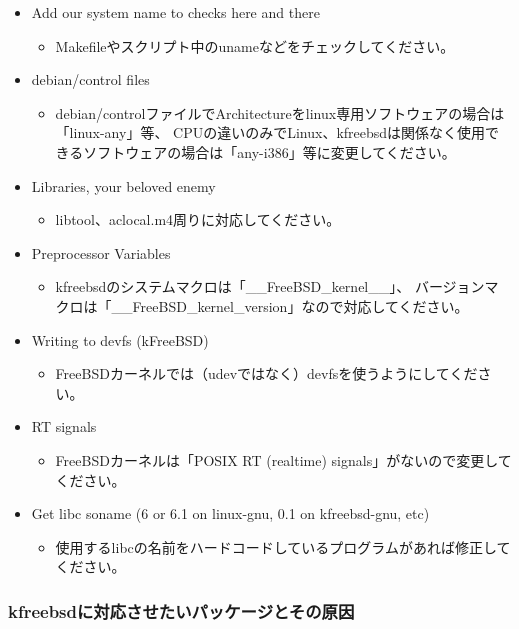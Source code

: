 \documentclass[mingoth,a4paper]{jsarticle}
\begin{document}
\begin{itemize}
 \item{Add our system name to checks here and there}
  \begin{itemize}
   \item{Makefileやスクリプト中のunameなどをチェックしてください。 }
  \end{itemize}
 \item{debian/control files}
  \begin{itemize}
   \item{debian/controlファイルでArchitectureをlinux専用ソフトウェアの場合は「linux-any」等、
CPUの違いのみでLinux、kfreebsdは関係なく使用できるソフトウェアの場合は「any-i386」等に変更してください。}
  \end{itemize}
 \item{Libraries, your beloved enemy}
  \begin{itemize}
   \item{libtool、aclocal.m4周りに対応してください。}
  \end{itemize}
 \item{Preprocessor Variables}
  \begin{itemize}
   \item{kfreebsdのシステムマクロは「\_\_FreeBSD\_kernel\_\_」、
バージョンマクロは「\_\_FreeBSD\_kernel\_version」なので対応してください。}
  \end{itemize}
 \item{Writing to devfs (kFreeBSD)}
  \begin{itemize}
   \item{FreeBSDカーネルでは（udevではなく）devfsを使うようにしてください。}
  \end{itemize}
 \item{RT signals}
  \begin{itemize}
   \item{FreeBSDカーネルは「POSIX RT (realtime) signals」がないので変更してください。}
  \end{itemize}
 \item{Get libc soname (6 or 6.1 on linux-gnu, 0.1 on kfreebsd-gnu, etc)}
  \begin{itemize}
   \item{使用するlibcの名前をハードコードしているプログラムがあれば修正してください。}
  \end{itemize}
\end{itemize}


\subsubsection{kfreebsdに対応させたいパッケージとその原因}
\end{document}
